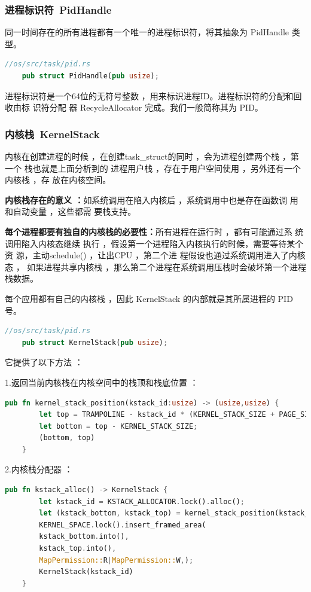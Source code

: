 \subsubsection{进程标识符\ PidHandle}
同一时间存在的所有进程都有一个唯一的进程标识符，将其抽象为 PidHandle 类型。
\begin{lstlisting}[language=Rust]
	//os/src/task/pid.rs
	pub struct PidHandle(pub usize);
\end{lstlisting}

进程标识符是一个64位的无符号整数 ，用来标识进程ID。进程标识符的分配和回收由标
识符分配 器 RecycleAllocator 完成。我们一般简称其为 PID。

\subsubsection{内核栈\ KernelStack}
内核在创建进程的时候 ，在创建task\_struct的同时 ，会为进程创建两个栈 ，第一个
栈也就是上面分析到的 进程用户栈 ，存在于用户空间使用 ，另外还有一个内核栈 ，存
放在内核空间。

\textbf{内核栈存在的意义 ：}如系统调用在陷入内核后 ，系统调用中也是存在函数调
用和自动变量 ，这些都需 要栈支持。

\textbf{每个进程都要有独自的内核栈的必要性：}所有进程在运行时 ，都有可能通过系
统调用陷入内核态继续 执行 ，假设第一个进程陷入内核执行的时候，需要等待某个资
源，主动schedule() ，让出CPU ，第二个进 程假设也通过系统调用进入了内核态 ，
如果进程共享内核栈 ，那么第二个进程在系统调用压栈时会破坏第一个进程栈数据。

每个应用都有自己的内核栈 ，因此 KernelStack 的内部就是其所属进程的 PID 号。

\begin{lstlisting}[language=Rust]
	//os/src/task/pid.rs
	pub struct KernelStack(pub usize);
\end{lstlisting}

它提供了以下方法 ：

1.返回当前内核栈在内核空间中的栈顶和栈底位置 ：
\begin{lstlisting}[language=Rust]
	pub fn kernel_stack_position(kstack_id:usize) -> (usize,usize) {
		let top = TRAMPOLINE - kstack_id * (KERNEL_STACK_SIZE + PAGE_SIZE);
		let bottom = top - KERNEL_STACK_SIZE;
		(bottom, top)
	}
\end{lstlisting}

2.内核栈分配器 ：
\begin{lstlisting}[language=Rust]
	pub fn kstack_alloc() -> KernelStack {
		let kstack_id = KSTACK_ALLOCATOR.lock().alloc();
		let (kstack_bottom, kstack_top) = kernel_stack_position(kstack_id);
		KERNEL_SPACE.lock().insert_framed_area(
		kstack_bottom.into(),
		kstack_top.into(),
		MapPermission::R|MapPermission::W,);
		KernelStack(kstack_id)
	}
\end{lstlisting}

